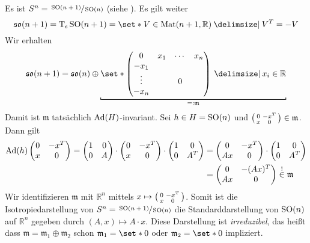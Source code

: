 \begin{beispiel*}[{name=[Isotropiedarstellung der Sphäre]}]
	Es ist $S^n = \sfrac{\operatorname{SO}(n+1)}{\operatorname{SO}(n)}$ (siehe ). 
	Es gilt weiter
	\[
		\mathfrak{so}(n+1) = \Tmap_e \SO(n+1) = \set*{V \in \Mat(n+1,\mathbb{R}) \given V^T = -V}
	\]
	Wir erhalten 
	\[
		\mathfrak{so}(n+1) = \mathfrak{so}(n) \oplus  \Underbracket{\set*{\begin{pmatrix}
			0 & x_1 & \cdots & x_n \\
			-x_1 & & & \\
			\vdots & & 0 & \\
			-x_n & & & 
		\end{pmatrix} \given x_i \in \mathbb{R}}}{=: \mathfrak{m}}
	\]
	Damit ist $\mathfrak{m}$ tatsächlich $\operatorname{Ad}(H)$-invariant.
	Sei $h \in H = \operatorname{SO}(n)$ und $\begin{psmallmatrix}
		0 & -x^T \\ x & 0
	\end{psmallmatrix} \in \mathfrak{m}$.
	Dann gilt 
	\begin{align}
			\operatorname{Ad}(h) \begin{pmatrix}
			0 & -x^T \\ x & 0
		\end{pmatrix} = \begin{pmatrix}
			1 & 0 \\ 0 & A
		\end{pmatrix} \cdot \begin{pmatrix}
			0 & -x^T \\ x & 0
		\end{pmatrix} \cdot \begin{pmatrix}
			1 & 0 \\
			0 & A^T
		\end{pmatrix} &= \begin{pmatrix}
			0 & - x^T \\ Ax & 0 
		\end{pmatrix} \cdot \begin{pmatrix}
			1 & 0 \\ 0 & A^T
		\end{pmatrix} \\
		&= \begin{pmatrix}
			0 & -(Ax)^T \\ Ax & 0
		\end{pmatrix} 
		\stackrel{!}{\in } \mathfrak{m}
	\end{align}
	Wir identifizieren $\mathfrak{m}$ mit $\mathbb{R}^n$ mittels $x \mapsto \begin{psmallmatrix}
		0 & -x^T \\ x & 0
	\end{psmallmatrix}$.
	Somit ist die Isotropiedarstellung von $S^n = \sfrac{\operatorname{SO}(n+1)}{\operatorname{SO}(n)}$ die Standarddarstellung von $\operatorname{SO}(n)$ auf $\mathbb{R}^n$ gegeben durch $(A,x) \mapsto A \cdot x$. 
	Diese Darstellung ist \emph{irreduzibel}, das heißt dass $\mathfrak{m} = \mathfrak{m}_1 \oplus \mathfrak{m}_2$ schon $\mathfrak{m}_1= \set*{0}$ oder $\mathfrak{m}_2 =\set*{0}$ impliziert.
\end{beispiel*}

